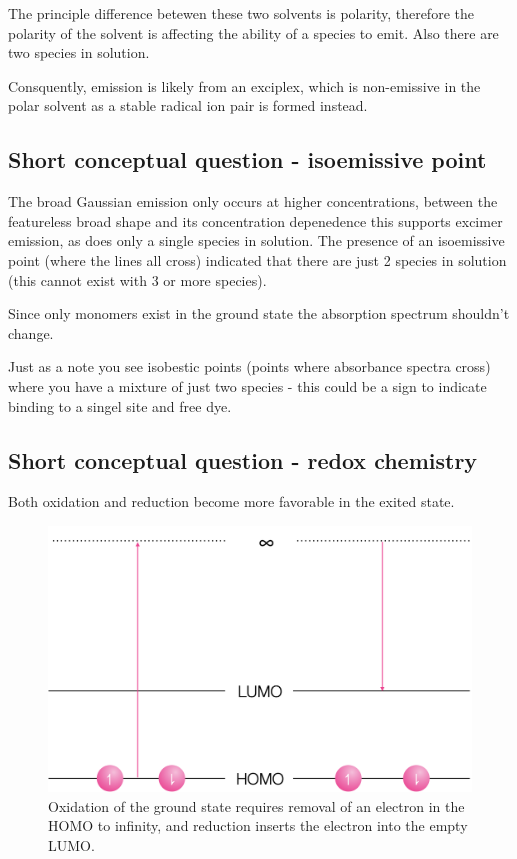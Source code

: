 \documentclass[
]{book}
\begin{document}
The principle difference betewen these two solvents is polarity, therefore the polarity of the solvent is affecting the ability of a species to emit. Also there are two species in solution.

Consquently, emission is likely from an exciplex, which is non-emissive in the polar solvent as a stable radical ion pair is formed instead.

\hypertarget{short-conceptual-question---isoemissive-point-1}{%
\subsection{Short conceptual question - isoemissive point}\label{short-conceptual-question---isoemissive-point-1}}

The broad Gaussian emission only occurs at higher concentrations, between the featureless broad shape and its concentration depenedence this supports excimer emission, as does only a single species in solution. The presence of an isoemissive point (where the lines all cross) indicated that there are just 2 species in solution (this cannot exist with 3 or more species).

Since only monomers exist in the ground state the absorption spectrum shouldn't change.

Just as a note you see isobestic points (points where absorbance spectra cross) where you have a mixture of just two species - this could be a sign to indicate binding to a singel site and free dye.

\hypertarget{short-conceptual-question---redox-chemistry-1}{%
\subsection{Short conceptual question - redox chemistry}\label{short-conceptual-question---redox-chemistry-1}}

Both oxidation and reduction become more favorable in the exited state.

\begin{figure}

{\centering \includegraphics[width=0.7\linewidth]{images/gsredox} 

}

\caption{Oxidation of the ground state requires removal of an electron in the HOMO to infinity, and reduction inserts the electron into the empty LUMO.}\label{fig:gsredox}
\end{figure}
\end{document}
